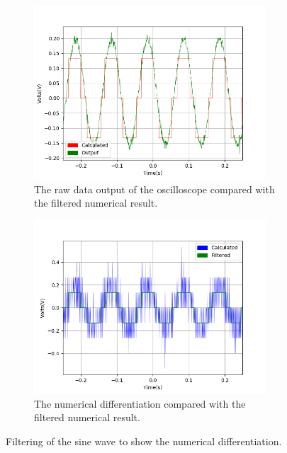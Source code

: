 \begin{figure}[h!]
\centering
\begin{subfigure}[t]{.475\textwidth}
  \centering
  \includegraphics[width=0.95\textwidth, height=0.22\textheight]{figures/Differentiation/scope_19_calc_behind.png}
  \caption{The raw data output of the oscilloscope compared with the filtered numerical result.}
 \label{fig:diff_19}
\end{subfigure}\hfill
\begin{subfigure}[t]{.475\textwidth}
  \centering
  \includegraphics[width=0.95\textwidth, height=0.22\textheight]{figures/Differentiation/scope_19diff_filtered.png}
  \caption{The numerical differentiation compared with the filtered numerical result.}
\label{fig:diff_19_filter_compare}
\end{subfigure}
\caption{Filtering of the sine wave to show the numerical differentiation.}
\label{fig:diff_sine}
\end{figure}

